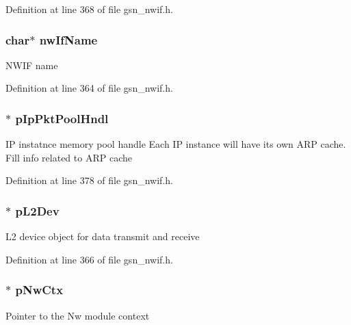Definition at line 368 of file gsn\_\-nwif.h.

\hypertarget{a00169_a34883f8c4ec77659710bb1b1e8f7ccae}{
\subsubsection[{nwIfName}]{\setlength{\rightskip}{0pt plus 5cm}char$\ast$ {\bf nwIfName}}}
\label{a00169_a34883f8c4ec77659710bb1b1e8f7ccae}
NWIF name 

Definition at line 364 of file gsn\_\-nwif.h.

\hypertarget{a00169_a4cdcdc7a80f5e9b124e3cdff24cdcaec}{
\subsubsection[{pIpPktPoolHndl}]{$\ast$ {\bf pIpPktPoolHndl}}}
\label{a00169_a4cdcdc7a80f5e9b124e3cdff24cdcaec}
IP instatnce memory pool handle Each IP instance will have its own ARP cache. Fill info related to ARP cache 

Definition at line 378 of file gsn\_\-nwif.h.

\hypertarget{a00169_a26c032e68793c08c6f4c3509dee1e4f2}{
\subsubsection[{pL2Dev}]{$\ast$ {\bf pL2Dev}}}
\label{a00169_a26c032e68793c08c6f4c3509dee1e4f2}
L2 device object for data transmit and receive 

Definition at line 366 of file gsn\_\-nwif.h.

\hypertarget{a00169_a4ab8e1b7273bd13fb04f9726ebf1d430}{
\subsubsection[{pNwCtx}]{$\ast$ {\bf pNwCtx}}}
\label{a00169_a4ab8e1b7273bd13fb04f9726ebf1d430}
Pointer to the Nw module context 

